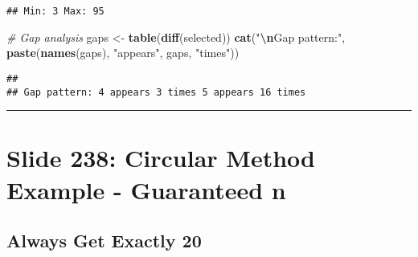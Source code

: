 \documentclass[
]{article}
\newenvironment{Shaded}{\begin{snugshade}}{\end{snugshade}}
\newcommand{\CommentTok}[1]{\textcolor[rgb]{0.56,0.35,0.01}{\textit{#1}}}
\newcommand{\FunctionTok}[1]{\textcolor[rgb]{0.13,0.29,0.53}{\textbf{#1}}}
\newcommand{\NormalTok}[1]{#1}
\newcommand{\OtherTok}[1]{\textcolor[rgb]{0.56,0.35,0.01}{#1}}
\newcommand{\SpecialCharTok}[1]{\textcolor[rgb]{0.81,0.36,0.00}{\textbf{#1}}}
\newcommand{\StringTok}[1]{\textcolor[rgb]{0.31,0.60,0.02}{#1}}
\begin{document}
\begin{verbatim}
## Min: 3 Max: 95
\end{verbatim}

\begin{Shaded}
\begin{Highlighting}[]
\CommentTok{\# Gap analysis}
\NormalTok{gaps }\OtherTok{\textless{}{-}} \FunctionTok{table}\NormalTok{(}\FunctionTok{diff}\NormalTok{(selected))}
\FunctionTok{cat}\NormalTok{(}\StringTok{"}\SpecialCharTok{\textbackslash{}n}\StringTok{Gap pattern:"}\NormalTok{, }\FunctionTok{paste}\NormalTok{(}\FunctionTok{names}\NormalTok{(gaps), }\StringTok{"appears"}\NormalTok{, gaps, }\StringTok{"times"}\NormalTok{))}
\end{Highlighting}
\end{Shaded}

\begin{verbatim}
## 
## Gap pattern: 4 appears 3 times 5 appears 16 times
\end{verbatim}

\begin{center}\rule{0.5\linewidth}{0.5pt}\end{center}

\section{Slide 238: Circular Method Example - Guaranteed
n}\label{slide-238-circular-method-example---guaranteed-n}

\subsection{Always Get Exactly 20}\label{always-get-exactly-20}
\end{document}
